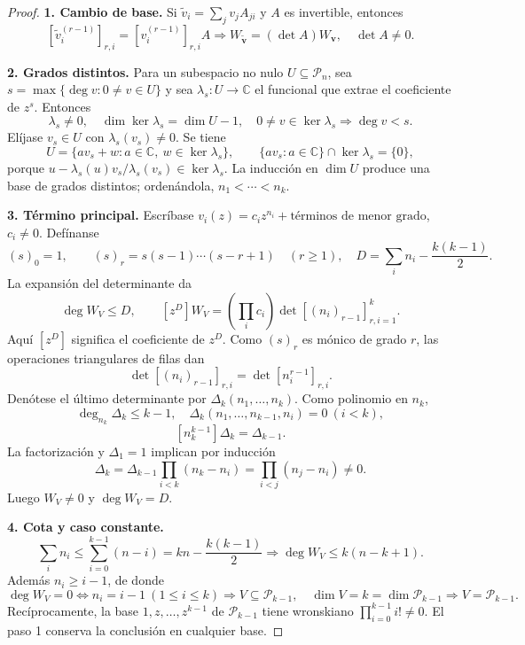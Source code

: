 \documentclass[11pt,a4paper]{article}
\numberwithin{equation}{section}
\theoremstyle{definition}
\theoremstyle{remark}
\newcommand{\C}{\mathbb C}
\newcommand{\PP}{\mathcal P}
\newcommand{\paso}[1]{\par\smallskip\noindent\textbf{#1}\quad}
\begin{document}
\begin{proof}
\paso{1. Cambio de base.}
Si $\widetilde v_i=\sum_jv_jA_{ji}$ y $A$ es invertible, entonces
\[
[\widetilde v_i^{(r-1)}]_{r,i}=[v_i^{(r-1)}]_{r,i}A
\Longrightarrow W_{\widetilde{\boldsymbol v}}=(\det A)W_{\boldsymbol v},\quad\det A\ne0.
\]
\paso{2. Grados distintos.}
Para un subespacio no nulo $U\subseteq\PP_n$, sea $s=\max\{\deg v:0\ne v\in U\}$ y sea $\lambda_s:U\to\C$ el funcional que extrae el coeficiente de $z^s$. Entonces
\[
\lambda_s\ne0,\quad\dim\ker\lambda_s=\dim U-1,\quad
0\ne v\in\ker\lambda_s\Longrightarrow\deg v<s.
\]
Elíjase $v_s\in U$ con $\lambda_s(v_s)\ne0$. Se tiene
\[
U=\{a v_s+w:a\in\C,\ w\in\ker\lambda_s\},\qquad\{a v_s:a\in\C\}\cap\ker\lambda_s=\{0\},
\]
porque $u-\lambda_s(u)v_s/\lambda_s(v_s)\in\ker\lambda_s$. La inducción en $\dim U$ produce una base de grados distintos; ordenándola, $n_1<\cdots<n_k$.
\paso{3. Término principal.}
Escríbase $v_i(z)=c_iz^{n_i}+\text{términos de menor grado}$, $c_i\ne0$. Defínanse
\[
(s)_0=1,\qquad(s)_r=s(s-1)\cdots(s-r+1)\quad(r\ge1),
\quad D=\sum_i n_i-\frac{k(k-1)}2.
\]
La expansión del determinante da
\[
\deg W_V\le D,\qquad [z^D]W_V
=\left(\prod_i c_i\right)\det[(n_i)_{r-1}]_{r,i=1}^k.
\]
Aquí $[z^D]$ significa el coeficiente de $z^D$. Como $(s)_r$ es mónico de grado $r$, las operaciones triangulares de filas dan
\[
\det[(n_i)_{r-1}]_{r,i}=\det[n_i^{r-1}]_{r,i}.
\]
Denótese el último determinante por $\Delta_k(n_1,\ldots,n_k)$. Como polinomio en $n_k$,
\[
\deg_{n_k}\Delta_k\le k-1,\quad
\Delta_k(n_1,\ldots,n_{k-1},n_i)=0\ (i<k),
\]
\[
[n_k^{k-1}]\Delta_k=\Delta_{k-1}.
\]
La factorización y $\Delta_1=1$ implican por inducción
\[
\Delta_k=\Delta_{k-1}\prod_{i<k}(n_k-n_i)
=\prod_{i<j}(n_j-n_i)\ne0.
\]
Luego $W_V\ne0$ y $\deg W_V=D$.
\paso{4. Cota y caso constante.}
\[
\sum_i n_i\le\sum_{i=0}^{k-1}(n-i)=kn-\frac{k(k-1)}2
\Longrightarrow\deg W_V\le k(n-k+1).
\]
Además $n_i\ge i-1$, de donde
\[
\deg W_V=0\Longleftrightarrow n_i=i-1\ (1\le i\le k)
\Longrightarrow V\subseteq\PP_{k-1},\quad\dim V=k=\dim\PP_{k-1}
\Longrightarrow V=\PP_{k-1}.
\]
Recíprocamente, la base $1,z,\ldots,z^{k-1}$ de $\PP_{k-1}$ tiene wronskiano $\prod_{i=0}^{k-1}i!\ne0$. El paso 1 conserva la conclusión en cualquier base.
\end{proof}
\end{document}

